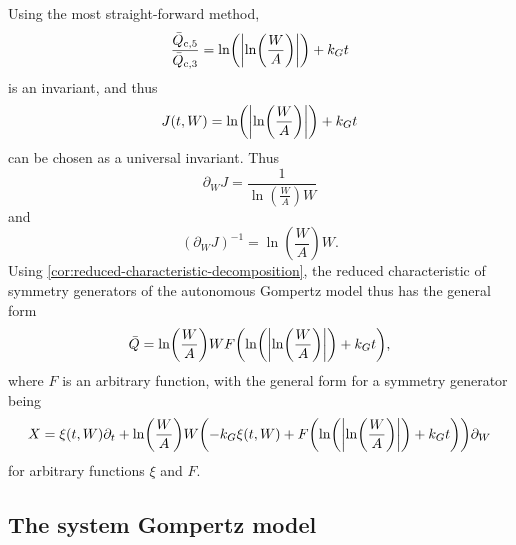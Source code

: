 Using the most straight-forward method,
\begin{equation*}
  \frac{\bar{Q}_{\text{c},5}}{\bar{Q}_{\text{c},3}} = \ln\left(\abs{\ln\left(\frac{W}{A}\right)}\right) + k_G t
\end{equation*}
is an invariant, and thus
\begin{equation*}
  J(t, W) = \ln\left(\abs{\ln\left(\frac{W}{A}\right)}\right) + k_G t
\end{equation*}
can be chosen as a universal invariant.
Thus
\begin{equation*}
  \partial_W J = \frac{1}{\ln\left(\frac{W}{A}\right) W}
\end{equation*}
and
\begin{equation*}
  \left(\partial_W J\right)^{-1} = \ln\left(\frac{W}{A}\right) W.
\end{equation*}
Using \cref{cor:reduced-characteristic-decomposition}, the reduced characteristic of symmetry generators of the autonomous Gompertz model thus has the general form
\begin{equation} \label{eq:general-autonomous-gompertz-characteristic}
  \bar{Q} = \ln\left(\frac{W}{A}\right) W F\left(\ln\left(\abs{\ln\left(\frac{W}{A}\right)}\right) + k_G t\right),
\end{equation}
where \(F\) is an arbitrary function, with the general form for a symmetry generator being
\begin{equation} \label{eq:general-autonomous-gompertz-symmetry}
  X = \xi(t, W) \partial_t + \ln\left(\frac{W}{A}\right) W \left(-k_G \xi(t, W) + F\left(\ln\left(\abs{\ln\left(\frac{W}{A}\right)}\right) + k_G t\right)\right) \partial_W
\end{equation}
for arbitrary functions \(\xi\) and \(F\).

\subsection{The system Gompertz model}

